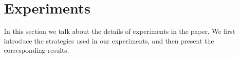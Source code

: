 \documentclass[conference]{IEEEtran}
\begin{document}
\iffalse
\section{Experiments}\label{sec:exp}

In this section we talk about the details of experiments in the paper. We first introduce the 
strategies used in our experiments, and then present the corresponding results.  

\iffalse
\begin{figure}[t]
\begin{minipage}[b]{0.45\linewidth}
\centering
\texttt{[image: Qformulas]}
\caption{Experimental results on Q pattern formulas ().}
\label{fig:Qformulas}
\vspace{0.3cm}
\end{minipage}
\hspace{0.6cm}
\begin{minipage}[b]{0.45\linewidth}
\centering
\texttt{[image: O2formulas]}
\caption{Experimental results on O2 pattern formulas ().}
\label{fig:O2formulas}

\end{minipage}
\end{figure}
\fi
\end{document}
